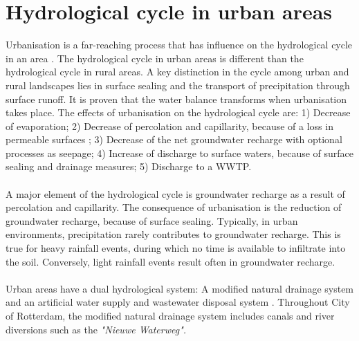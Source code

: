 \section{Hydrological cycle in urban areas}
Urbanisation is a far-reaching process that has influence on the hydrological cycle in an area \cite{bakel-1995}. The hydrological cycle in urban areas is different than the hydrological cycle in rural areas. A key distinction in the cycle among urban and rural landscapes lies in surface sealing and the transport of precipitation through surface runoff. It is proven that the water balance transforms when urbanisation takes place. The effects of urbanisation on the hydrological cycle are: 1) Decrease of evaporation; 2) Decrease of percolation and capillarity, because of a loss in permeable surfaces \cite{etikala-2022}; 3) Decrease of the net groundwater recharge with optional processes as seepage; 4) Increase of discharge to surface waters, because of surface sealing and drainage measures; 5) Discharge to a WWTP.\\
\\
A major element of the hydrological cycle is groundwater recharge as a result of percolation and capillarity. The consequence of urbanisation is the reduction of groundwater recharge, because of surface sealing. Typically, in urban environments, precipitation rarely contributes to groundwater recharge. This is true for heavy rainfall events, during which no time is available to infiltrate into the soil. Conversely, light rainfall events result often in groundwater recharge. \\
\\
Urban areas have a dual hydrological system: A modified natural drainage system and an artificial water supply and wastewater disposal system \cite{douglas-2020}.  Throughout City of Rotterdam, the modified natural drainage system includes canals and river diversions such as the \textit{"Nieuwe Waterweg".}

